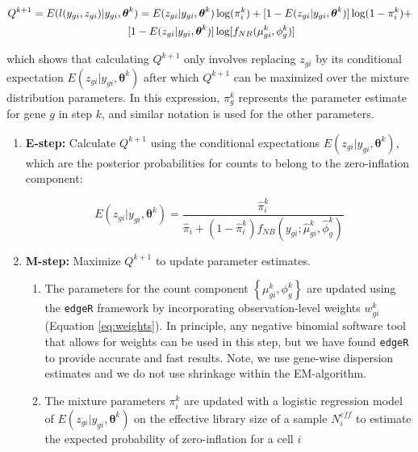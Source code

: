 \documentclass{bmcart}
\newcommand{\mb}[1]{\boldsymbol{\mathbf{#1}}}
\begin{document}
\begin{backmatter}
\begin{align*}
Q^{k+1}&=E(l(y_{gi},z_{gi})|y_{gi}, \mb{\theta}^k) = E(z_{gi}|y_{gi}, \mb{\theta}^k)\log(\pi_i^k) + [1-E(z_{gi}|y_{gi},\mb{\theta}^k)]\log(1-\pi_i^k) + \\
&\hskip0.26\textwidth [1-E(z_{gi}|y_{gi}, \mb{\theta}^k)]\log [f_{NB}(\mu_{gi}^k,\phi_g^k)]
\end{align*}

which shows that calculating $Q^{k+1}$ only involves replacing $z_{gi}$ by its conditional expectation $E(z_{gi}|y_{gi}, \mb{\theta}^k)$ after which $Q^{k+1}$ can be maximized over the mixture distribution parameters. In this expression, $\pi_g^k$ represents the parameter estimate for gene $g$ in step $k$, and similar notation is used for the other parameters.

\begin{enumerate}	
	\item \textbf{E-step:} Calculate $Q^{k+1}$ using the conditional expectations $E(z_{gi}|y_{gi}, \mb{\theta}^k)$, which are the posterior probabilities for counts to belong to the zero-inflation component:
	
	\[ E(z_{gi}|y_{gi}, \mb{\theta}^k) = \frac{\hat{\pi}_{i}^k}{\hat{\pi}_{i} + (1-\hat{\pi}_{i}^k) f_{NB}(y_{gi};\hat{\mu}_{gi}^k,\hat{\phi}_g^k)} \]
	
	\item \textbf{M-step:} Maximize $Q^{k+1}$ to update parameter estimates.

	\begin{enumerate}
		\item The parameters for the count component $\left\{\mu_{gi}^k,\phi_g^k \right\}$ are updated using the  \texttt{edgeR} framework \cite{Robinson2010a} by incorporating observation-level weights $w_{gi}^k$ (Equation \eqref{eq:weights}). In principle, any negative binomial software tool that allows for weights can be used in this step, but we have found \texttt{edgeR} to provide accurate and fast results. Note, we use gene-wise dispersion estimates and we do not use shrinkage within the EM-algorithm.
		
		\item
		The mixture parameters $\pi_i^{k}$ are updated with a logistic regression model of $E(z_{gi}|y_{gi}, \mb{\theta}^k)$ on the effective library size of a sample $N_i^{eff}$ to estimate the expected probability of zero-inflation for a cell $i$
	

\end{enumerate}
\end{enumerate}
\end{backmatter}
\end{document}
